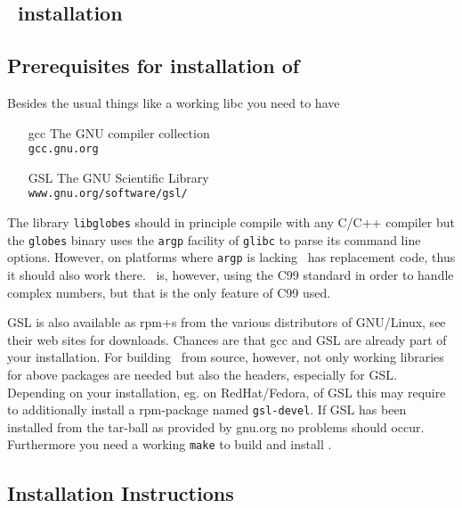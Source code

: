 
\begin{appendix}

\chapter{\GLOBES\ installation}
\label{app:installation}

\section*{Prerequisites for installation of \GLOBES}

Besides the usual things like a working libc you need to have
 \begin{itemize}
        \item[gcc]      The GNU compiler collection\\
                        \verb+gcc.gnu.org+
        \item[GSL]      The GNU Scientific Library\\
                        \verb+www.gnu.org/software/gsl/+
\end{itemize}
The library \verb+libglobes+ should in principle compile with any C/C++
compiler but the \verb+globes+ binary uses the \verb+argp+ facility of \verb+glibc+
to parse its command line options. However, on platforms where \verb+argp+
is lacking \GLOBES\ has replacement code, thus it should also work
there. \GLOBES\ is, however, using the C99 standard in order to handle
complex numbers, but that is the only feature of C99 used.

GSL is also available as rpm+s from the various distributors of
GNU/Linux, see their web sites for downloads. Chances are that gcc and
GSL are already part of your installation.  For building \GLOBES\ from
source, however, not only working libraries for above packages are
needed but also the headers, especially for GSL. Depending on your
installation, eg. on RedHat/Fedora, of GSL this may require to
additionally install a rpm-package named \verb+gsl-devel+. If GSL has been
installed from the tar-ball as provided by gnu.org no problems should
occur. Furthermore you need a working \verb+make+ to build and install
\GLOBES.


\section*{Installation Instructions}



\end{appendix}
